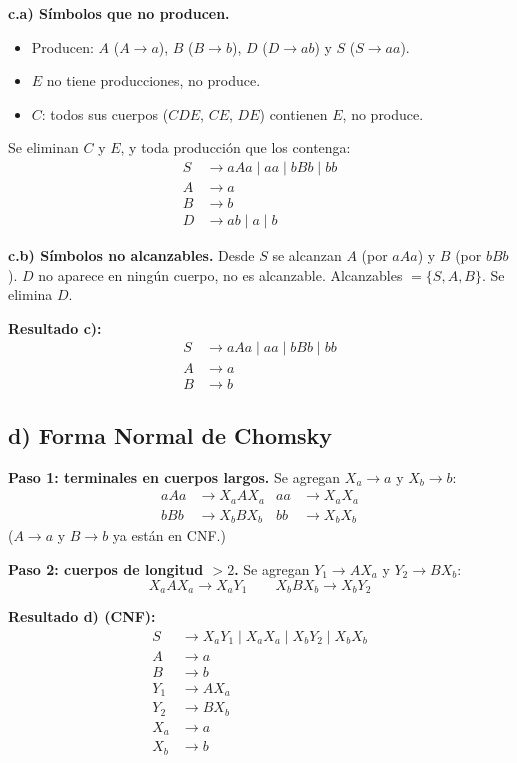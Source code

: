 \documentclass[11pt]{article}
\begin{document}
\textbf{c.a) S\'imbolos que no producen.}
\begin{itemize}[nosep]
  \item Producen: $A$ ($A \to a$), $B$ ($B \to b$), $D$ ($D \to ab$) y $S$ ($S \to aa$).
  \item $E$ no tiene producciones, no produce.
  \item $C$: todos sus cuerpos ($CDE$, $CE$, $DE$) contienen $E$, no produce.
\end{itemize}
Se eliminan $C$ y $E$, y toda producci\'on que los contenga:
\begin{align*}
S &\to aAa \mid aa \mid bBb \mid bb\\
A &\to a\\
B &\to b\\
D &\to ab \mid a \mid b
\end{align*}

\textbf{c.b) S\'imbolos no alcanzables.} Desde $S$ se alcanzan $A$ (por $aAa$) y $B$ (por $bBb$). $D$ no aparece en ning\'un cuerpo, no es alcanzable. Alcanzables $=\{S,A,B\}$. Se elimina $D$.

\textbf{Resultado c):}
\begin{align*}
S &\to aAa \mid aa \mid bBb \mid bb\\
A &\to a\\
B &\to b
\end{align*}

\subsection*{d) Forma Normal de Chomsky}

\textbf{Paso 1: terminales en cuerpos largos.} Se agregan $X_a \to a$ y $X_b \to b$:
\begin{align*}
aAa &\to X_a A X_a & aa &\to X_a X_a\\
bBb &\to X_b B X_b & bb &\to X_b X_b
\end{align*}
($A \to a$ y $B \to b$ ya est\'an en CNF.)

\textbf{Paso 2: cuerpos de longitud $>2$.} Se agregan $Y_1 \to A X_a$ y $Y_2 \to B X_b$:
\[ X_a A X_a \to X_a Y_1 \qquad X_b B X_b \to X_b Y_2 \]

\textbf{Resultado d) (CNF):}
\begin{align*}
S &\to X_a Y_1 \mid X_a X_a \mid X_b Y_2 \mid X_b X_b\\
A &\to a\\
B &\to b\\
Y_1 &\to A X_a\\
Y_2 &\to B X_b\\
X_a &\to a\\
X_b &\to b
\end{align*}
\end{document}

